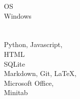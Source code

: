             OS\\
            Windows\\\\
            \\
            Python, Javascript, \\
            HTML
            \\
            SQLite
            \\
            Markdown, Git, LaTeX,\\
            Microsoft Office,\\
            Minitab